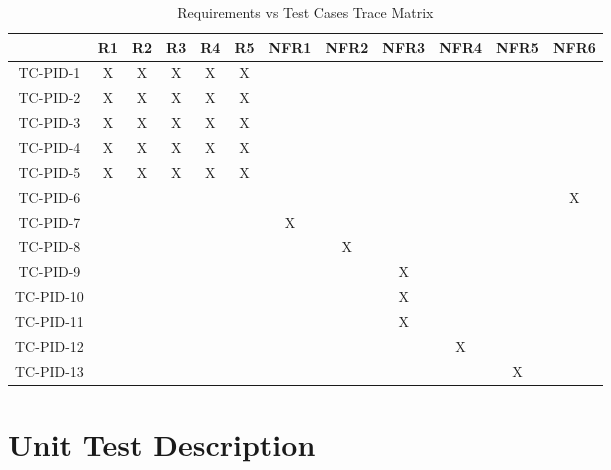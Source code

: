 \documentclass[12pt, titlepage]{article}
\begin{document}
\begin{table}[]
\caption{Requirements vs Test Cases Trace Matrix}
\label{tblTrace}
\begin{tabular}{|c|c|c|c|c|c|c|c|c|c|c|c|}
\hline
          & R1 & R2 & R3 & R4 & R5 & NFR1 & NFR2 & NFR3 & NFR4 & NFR5 & NFR6 \\ \hline
TC-PID-1  & X  & X  & X  & X  & X  &      &      &      &      &      &      \\ \hline
TC-PID-2  & X  & X  & X  & X  & X  &      &      &      &      &      &      \\ \hline
TC-PID-3  & X  & X  & X  & X  & X  &      &      &      &      &      &      \\ \hline
TC-PID-4  & X  & X  & X  & X  & X  &      &      &      &      &      &      \\ \hline
TC-PID-5  & X  & X  & X  & X  & X  &      &      &      &      &      &      \\ \hline
TC-PID-6  &    &    &    &    &    &      &      &      &      &      & X    \\ \hline
TC-PID-7  &    &    &    &    &    & X    &      &      &      &      &      \\ \hline
TC-PID-8  &    &    &    &    &    &      & X    &      &      &      &      \\ \hline
TC-PID-9  &    &    &    &    &    &      &      & X    &      &      &      \\ \hline
TC-PID-10 &    &    &    &    &    &      &      & X    &      &      &      \\ \hline
TC-PID-11 &    &    &    &    &    &      &      & X    &      &      &      \\ \hline
TC-PID-12 &    &    &    &    &    &      &      &      & X    &      &      \\ \hline
TC-PID-13 &    &    &    &    &    &      &      &      &      & X    &      \\ \hline
\end{tabular}
\end{table}

\section{Unit Test Description}  \label{sec_unit_tests}

\end{document}
